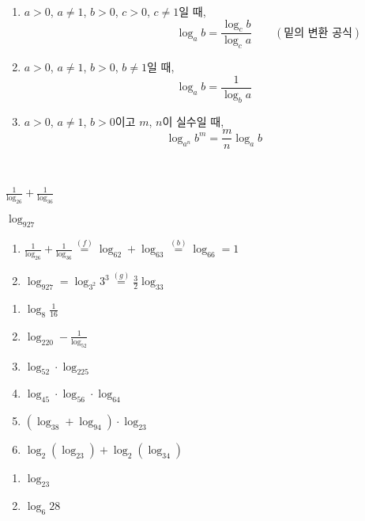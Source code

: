 \documentclass{oblivoir}
\begin{document}
\begin{mdframed}
%
\begin{enumerate}[label=(\alph*)]\label{prop9}
\setcounter{enumi}{4}
\item
\(a>0\), \(a\neq1\), \(b>0\), \(c>0\), \(c\neq1\)일 때,
\[\phantom{\qquad(\text{밑의 변환 공식})}\log_ab=\frac{\log_cb}{\log_ca}\qquad(\text{밑의 변환 공식})\]
\item
\(a>0\), \(a\neq1\), \(b>0\), \(b\neq1\)일 때,
\[\log_ab=\frac1{\log_ba}\]
\item
\(a>0\), \(a\neq1\), \(b>0\)이고 \(m\), \(n\)이 실수일 때,
\[\log_{a^n}{b^m}=\frac mn \log_ab\]
\end{enumerate}
\end{mdframed}

%
\label{prop10}
\\[-5pt]
\begin{enumerate*}[itemjoin=\tabto{.5\textwidth}]
\item
\(\frac1{\log_26}+\frac1{\log_36}\)
\item
\(\log_927\)
\end{enumerate*}
\begin{mdframed}
\begin{enumerate}
\item
\(\frac1{\log_26}+\frac1{\log_36}
\stackrel{(f)}=\log_62+\log_63
\stackrel{(b)}=\log_66=1\)
\item
\(\log_927=\log_{3^2}{3^3}
\stackrel{(g)}=\frac32\log_33\)
\end{enumerate}
\end{mdframed}

%
\begin{enumerate}\label{prop11}
\item
\(\log_8\frac1{16}\)
\item
\(\log_220-\frac1{\log_52}\)
\item
\(\log_52\cdot\log_225\)
\item
\(\log_45\cdot\log_56\cdot\log_64\)
\item
\((\log_38+\log_94)\cdot\log_23\)
\item
\(\log_2(\log_23)+\log_2(\log_34)\)
\end{enumerate}

\newpage
%
\begin{enumerate}\label{prop12}
\item
\(\log_23\)
\item
\(\log_6{28}\)
\end{enumerate}
\end{document}
